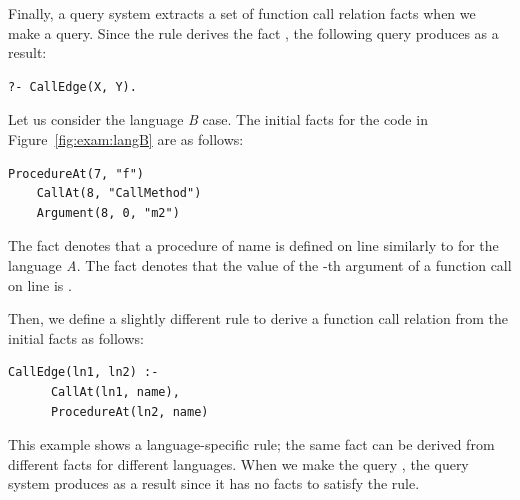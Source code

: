 Finally, a query system extracts a set of function call relation facts when we
make a query. Since the rule derives the fact , the
following query produces  as a result:


\begin{lstlisting}[style=mrule]
    ?- CallEdge(X, Y).
\end{lstlisting}


Let us consider the language {\it B} case.
The initial facts for the code in Figure~\ref{fig:exam:langB} are as follows: 

\begin{lstlisting}[style=mrule]
    ProcedureAt(7, "f")
    CallAt(8, "CallMethod")
    Argument(8, 0, "m2")
\end{lstlisting}

\noindent
The fact  denotes that a procedure of name
 is defined on line  similarly to
 for the language {\it A}.
The fact  denotes that the value of
the -th argument of a function call on line  is .

Then, we define a slightly different rule to derive a function call relation
from the initial facts as follows: 

\begin{lstlisting}[style=mrule]
    CallEdge(ln1, ln2) :-
      CallAt(ln1, name),
      ProcedureAt(ln2, name)
\end{lstlisting}

\noindent
This example shows a language-specific rule;
the same fact  can be derived from different facts for
different languages. When we make the query ,
the query system produces  as a result
since it has no facts to satisfy the rule.

